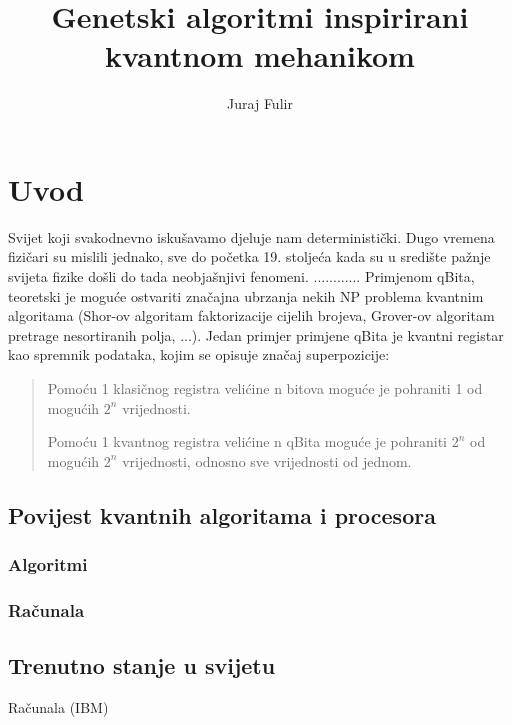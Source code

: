 \documentclass[times, utf8, zavrsni]{fer}
\begin{document}
\title{Genetski algoritmi inspirirani kvantnom mehanikom}
\author{Juraj Fulir}
\maketitle

\izvornik

\zahvala{}

\tableofcontents

\chapter{Uvod}
Svijet koji svakodnevno iskušavamo djeluje nam deterministički.
Dugo vremena fizičari su mislili jednako, sve do početka 19. stoljeća kada su u središte pažnje svijeta fizike došli do tada neobjašnjivi fenomeni.  ............
Primjenom qBita, teoretski je moguće ostvariti značajna ubrzanja nekih NP problema kvantnim algoritama (Shor-ov algoritam faktorizacije cijelih brojeva, Grover-ov algoritam pretrage nesortiranih polja, ...).
Jedan primjer primjene qBita je kvantni registar kao spremnik podataka, kojim se opisuje značaj superpozicije:

\begin{quote}
Pomoću 1 klasičnog registra velićine n bitova moguće je pohraniti 1 od mogućih $2^n$ vrijednosti.

Pomoću 1 kvantnog registra velićine n qBita moguće je pohraniti $2^n$ od mogućih $2^n$ vrijednosti, odnosno sve vrijednosti od jednom.
\end{quote}

\section{Povijest kvantnih algoritama i procesora}
\subsection{Algoritmi}
\subsection{Računala}
\section{Trenutno stanje u svijetu}
Računala (IBM)
\end{document}
